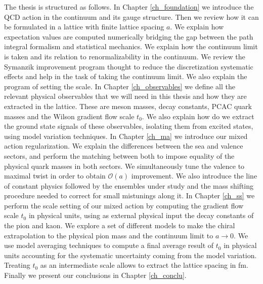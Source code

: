 The thesis is structured as follows. In Chapter \ref{ch_foundation} we introduce the QCD action in the continuum and its gauge structure. Then we review how it can be formulated in a lattice with finite lattice spacing $a$. We explain how expectation values are computed numerically bridging the gap between the path integral formalism and statistical mechanics. We explain how the continuum limit is taken and its relation to renormalizability in the continuum. We review the Symanzik improvement program thought to reduce the discretization systematic effects and help in the task of taking the continuum limit. We also explain the program of setting the scale. In Chapter \ref{ch_observables} we define all the relevant physical observables that we will need in this thesis and how they are extracted in the lattice. These are meson masses, decay constants, PCAC quark masses and the Wilson gradient flow scale $t_0$. We also explain how do we extract the ground state signals of these observables, isolating them from excited states, using model variation techniques. In Chapter \ref{ch_ma} we introduce our mixed action regularization. We explain the differences between the sea and valence sectors, and perform the matching between both to impose equality of the physical quark masses in both sectors. We simultaneously tune the valence to maximal twist in order to obtain $\mathcal{O}(a)$ improvement. We also introduce the line of constant physics followed by the ensembles under study and the mass shifting procedure needed to correct for small mistunings along it. In Chapter \ref{ch_ss} we perform the scale setting of our mixed action by computing the gradient flow scale $t_0$ in physical units, using as external physical input the decay constants of the pion and kaon. We explore a set of different models to make the chiral extrapolation to the physical pion mass and the continuum limit to $a\to0$. We use model averaging techniques to compute a final average result of $t_0$ in physical units accounting for the systematic uncertainty coming from the model variation. Treating $t_0$ as an intermediate scale allows to extract the lattice spacing in fm. Finally we present our conclusions in Chapter \ref{ch_conclu}. 

